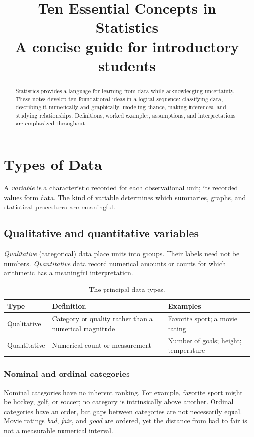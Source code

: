 \documentclass[11pt]{article}
\title{\textbf{Ten Essential Concepts in Statistics}\\[0.4em]
  \large A concise guide for introductory students}
\author{}
\date{}
\begin{document}
\maketitle

\begin{abstract}
Statistics provides a language for learning from data while acknowledging
uncertainty.  These notes develop ten foundational ideas in a logical
sequence: classifying data, describing it numerically and graphically,
modeling chance, making inferences, and studying relationships.  Definitions,
worked examples, assumptions, and interpretations are emphasized throughout.
\end{abstract}

\tableofcontents
\newpage

\section{Types of Data}\label{sec:data}
A \emph{variable} is a characteristic recorded for each observational unit;
its recorded values form data.  The kind of variable determines which
summaries, graphs, and statistical procedures are meaningful.

\subsection{Qualitative and quantitative variables}
\emph{Qualitative} (categorical) data place units into groups.  Their labels
need not be numbers.  \emph{Quantitative} data record numerical amounts or
counts for which arithmetic has a meaningful interpretation.

\begin{table}[ht]
\centering
\caption{The principal data types.}\label{tab:data-types}
\begin{tabularx}{\textwidth}{@{}lYY@{}}
\toprule
Type & Definition & Examples \\
\midrule
Qualitative & Category or quality rather than a numerical magnitude &
Favorite sport; a movie rating \\
Quantitative & Numerical count or measurement &
Number of goals; height; temperature \\
\bottomrule
\end{tabularx}
\end{table}

\subsubsection{Nominal and ordinal categories}
Nominal categories have no inherent ranking.  For example, favorite sport
might be hockey, golf, or soccer; no category is intrinsically above another.
Ordinal categories have an order, but gaps between categories are not
necessarily equal.  Movie ratings \emph{bad}, \emph{fair}, and \emph{good}
are ordered, yet the distance from bad to fair is not a measurable numerical
interval.
\end{document}
